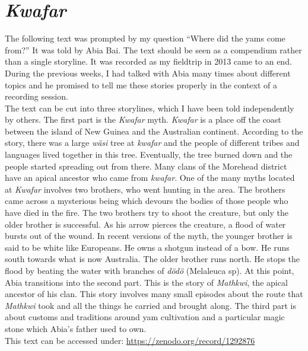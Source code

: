 
\appendix
{}

\section*{\emph{Kwafar}}\label{kwafar}

The following text was prompted by my question ``Where did the yams come from?'' It was told by Abia Bai. The text should be seen as a compendium rather than a single storyline. It was recorded as my fieldtrip in 2013 came to an end. During the previous weeks, I had talked with Abia many times about different topics and he promised to tell me these stories properly in the context of a recording session.\\ 

The text can be cut into three storylines, which I have been told independently by others. The first part is the \emph{Kwafar} myth. \emph{Kwafar} is a place off the coast between the island of New Guinea and the Australian continent. According to the story, there was a large \emph{wäsi} tree at \emph{kwafar} and the people of different tribes and languages lived together in this tree. Eventually, the tree burned down and the people started spreading out from there. Many clans of the Morehead district have an apical ancestor who came from \emph{kwafar}. One of the many myths located at \emph{Kwafar} involves two brothers, who went hunting in the area. The brothers came across a mysterious being which devours the bodies of those people who have died in the fire. The two brothers try to shoot the creature, but only the older brother is successful. As his arrow pierces the creature, a flood of water bursts out of the wound. In recent versions of the myth, the younger brother is said to be white like Europeans. He owns a shotgun instead of a bow. He runs south towards what is now Australia. The older brother runs north. He stops the flood by beating the water with branches of \emph{dödö} (Melaleuca sp). At this point, Abia transitions into the second part. This is the story of \emph{Mathkwi}, the apical ancestor of his clan. This story involves many small episodes about the route that \emph{Mathkwi} took and all the things he carried and brought along. The third part is about customs and traditions around yam cultivation and a particular magic stone which Abia's father used to own.\\

\noindent
This text can be accessed under: \href{https://zenodo.org/record/1292876}{https://zenodo.org/record/1292876}

